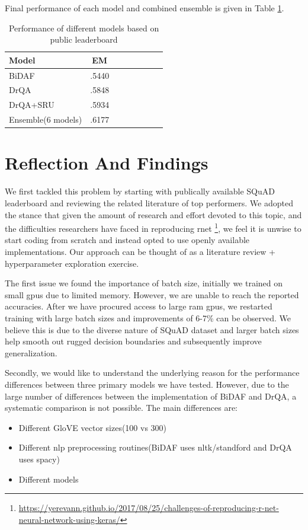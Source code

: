 \documentclass[paper=a4, fontsize=11pt]{scrartcl} %
\begin{document}
Final performance of each model and combined ensemble is given in Table \ref{tab:results}.

\begin{table}	\centering

	\caption{Performance of different models based on public leaderboard}	\label{tab:results}
	\begin{tabular}{l*{6}{c}r}
		Model              & EM   \\
		\hline
		BiDAF & .5440  \\
		DrQA            & .5848  \\
		DrQA+SRU           & .5934	  \\
		Ensemble(6 models)     & 	.6177  \\

	\end{tabular}

\end{table}

\section{Reflection And Findings}
We first tackled this problem by starting with publically available SQuAD leaderboard and reviewing the related literature of top performers. We adopted the stance that given the amount of research and effort devoted to this topic, and the difficulties researchers have faced in reproducing rnet \footnote{\url{https://yerevann.github.io/2017/08/25/challenges-of-reproducing-r-net-neural-network-using-keras/}}, we feel it is unwise to start coding from scratch and instead opted to use openly available implementations. Our approach can be thought of as a literature review + hyperparameter exploration exercise. 

The first issue we found the importance of batch size, initially we trained on small gpus due to limited memory. However, we are unable to reach the reported accuracies. After we have procured access to large ram gpus, we restarted training with large batch sizes and improvements of 6-7\% can be observed. We believe this is due to the diverse nature of SQuAD dataset and larger batch sizes help smooth out rugged decision boundaries and subsequently improve generalization.

Secondly, we would like to understand the underlying reason for the performance differences between three primary models we have tested. However, due to the large number of differences between the implementation of BiDAF and DrQA, a systematic comparison is not possible. The main differences are:
\begin{itemize}
	\item Different GloVE vector sizes(100 vs 300)
	\item Different nlp preprocessing routines(BiDAF uses nltk/standford and DrQA uses spacy)
	\item Different models
	
\end{itemize}
\end{document}
